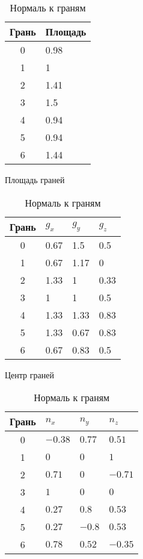 \begin{table}[H]
\centering
    \begin{minipage}[t]{.3\linewidth}
        \centering
        \begin{tabular}[t]{c|l}
        Грань & Площадь\\
        \hline
        0 &  0.98   \\
        1 &  1      \\
        2 &  1.41   \\
        3 &  1.5    \\
        4 &  0.94   \\
        5 &  0.94   \\
        6 &  1.44   \\
        \end{tabular}
        \caption{\label{tab:fvm3_tab_face_area} Площадь граней}
    \end{minipage}
    \;
    \begin{minipage}[t]{.3\linewidth}
        \centering
        \begin{tabular}[t]{c|l|l|l}
        Грань & $g_x$ & $g_y$ & $g_z$\\
        \hline
        0 & 0.67  & 1.5  & 0.5   \\
        1 & 0.67  & 1.17 & 0     \\
        2 & 1.33  & 1    & 0.33  \\
        3 & 1     & 1    & 0.5   \\
        4 & 1.33  & 1.33 & 0.83  \\
        5 & 1.33  & 0.67 & 0.83  \\
        6 & 0.67  & 0.83 & 0.5   \\
        \end{tabular}
        \caption{\label{tab:fvm3_tab_face_center} Центр граней}
    \end{minipage}
    \;
    \begin{minipage}[t]{.3\linewidth}
      \centering
      \begin{tabular}[t]{c|l|l|l}
      Грань & $n_x$ & $n_y$ & $n_z$ \\
      \hline
        0 & $-0.38$   & $ 0.77$  &  $ 0.51$ \\
        1 & $  0  $   & $  0  $  &  $  1  $ \\
        2 & $ 0.71$   & $  0  $  &  $-0.71$ \\
        3 & $  1  $   & $  0  $  &  $  0  $ \\
        4 & $ 0.27$   & $ 0.8 $  &  $ 0.53$ \\
        5 & $ 0.27$   & $-0.8 $  &  $ 0.53$ \\
        6 & $ 0.78$   & $ 0.52$  &  $-0.35$ \\
      \end{tabular}
      \caption{\label{tab:fvm3_tab_face_normal} Нормаль к граням}
    \end{minipage}
\end{table}

